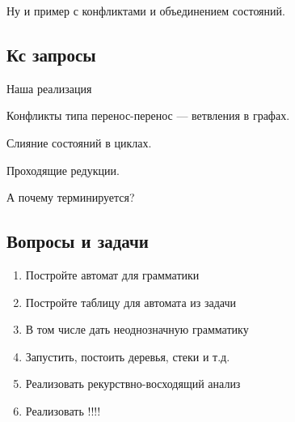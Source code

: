 \begin{example}
Ну и пример с конфликтами и объединением состояний.
\end{example}


\subsection{Кс запросы}


Наша реализация~\cite{10.1007/978-3-319-41579-6_22}

Конфликты типа перенос-перенос --- ветвления в графах.

Слияние состояний в циклах.

Проходящие редукции.

А почему терминируется?


\subsection{Вопросы и задачи}
\begin{enumerate}
\item Постройте автомат для грамматики
\item Постройте таблицу для автомата из задачи
\item В том числе дать неоднозначную грамматику
\item Запустить, постоить деревья, стеки и т.д.
\item Реализовать рекурствно-восходящий анализ
\item Реализовать !!!!
\end{enumerate}
